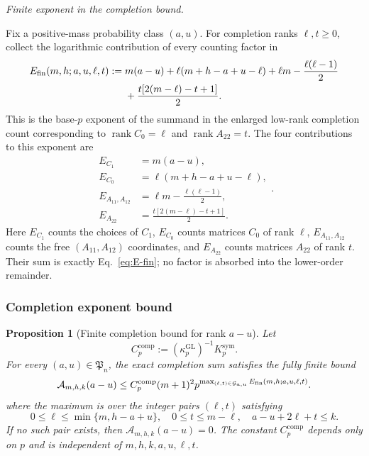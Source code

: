 \documentclass[11pt]{article}
\newcommand{\rank}{\operatorname{rank}}
\newcommand{\1}{\mathbf 1}
\theoremstyle{plain}
\newtheorem{proposition}[theorem]{Proposition}
\theoremstyle{definition}
\theoremstyle{remark}
\begin{document}
\medskip\noindent\emph{Finite exponent in the completion bound.}\par
Fix a positive-mass probability class $(a,u)$.  For completion ranks
$\ell,t\ge0$, collect the logarithmic contribution of every counting factor in
\begin{align}
 E_{\rm fin}(m,h;a,u,\ell,t)
 :={}&m(a-u)+\ell(m+h-a+u-\ell)
 +\ell m-\frac{\ell(\ell-1)}2\notag\\
 &+\frac{t[2(m-\ell)-t+1]}2.
 \label{eq:E-fin}
\end{align}
This is the base-$p$ exponent of the summand in the enlarged low-rank completion count
corresponding to $\rank C_0=\ell$ and $\rank A_{22}=t$.  The four contributions to this exponent are
\begin{equation}
 \begin{aligned}
 E_{C_1}&=m(a-u),\\
 E_{C_0}&=\ell(m+h-a+u-\ell),\\
 E_{A_{11},A_{12}}&=\ell m-\frac{\ell(\ell-1)}2,\\
 E_{A_{22}}&=\frac{t[2(m-\ell)-t+1]}2.
 \end{aligned}.
 \label{eq:odd-completion-factor-exponent-dictionary}
\end{equation}
Here $E_{C_1}$ counts the choices of $C_1$, $E_{C_0}$ counts matrices $C_0$
of rank $\ell$, $E_{A_{11},A_{12}}$ counts the free $(A_{11},A_{12})$
coordinates, and $E_{A_{22}}$ counts matrices $A_{22}$ of rank $t$.
Their sum is exactly Eq.~\eqref{eq:E-fin}; no factor is absorbed into the
lower-order remainder.

\subsubsection{Completion exponent bound}
\label{subsubsec:odd-completion-exponent-bound}

\begin{proposition}[Finite completion bound for rank $a-u$]
\label{prop:uniform-completion-bound}
Let
\begin{equation}
 C_p^{\mathrm{comp}}:=(\kappa_p^{\mathrm{GL}})^{-1}K_p^{\mathrm{sym}}.
 \label{eq:odd-completion-uniform-constant}
\end{equation}
For every $(a,u)\in\mathfrak P_n$, the exact completion sum satisfies the
fully finite bound
\begin{equation}
 \mathcal A_{m,h,k}(a-u)
 \le C_p^{\mathrm{comp}}(m+1)^2
 p^{\max_{(\ell,t)\in\mathcal G_{a,u}}
 E_{\rm fin}(m,h;a,u,\ell,t)}.
 \label{eq:uniform-completion-bound}
\end{equation}
where the maximum is over the integer pairs $(\ell,t)$ satisfying
\begin{equation}
 0\le\ell\le\min\{m,h-a+u\},\quad
 0\le t\le m-\ell,\quad
 a-u+2\ell+t\le k.
 \label{eq:finite-completion-ranges}
\end{equation}
If no such pair exists, then $\mathcal A_{m,h,k}(a-u)=0$.
The constant $C_p^{\mathrm{comp}}$ depends only on $p$ and is independent of
$m,h,k,a,u,\ell,t$.
\end{proposition}
\end{document}
